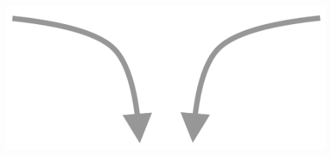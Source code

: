 \documentclass[presentation]{subfiles}
\begin{document}
\begin{frame}
  
  \begin{columns}[t]

  \begin{column}{0.32\textwidth}
    \begin{flushright}
    {\Large {}}
    \end{flushright}
  \end{column}

  \begin{column}{0.36\textwidth}

  \vspace{2em}
  
  \includegraphics[width=\textwidth]{figures/sketches/arrows.pdf}

  \begin{center}
  {\Large {}

  }
  \end{center}
  \end{column}
  
  \begin{column}{0.32\textwidth}
  \begin{flushleft}
  {\Large{}
    }

  \end{flushleft}
  \end{column}
  \end{columns}

\end{frame}
\end{document}
